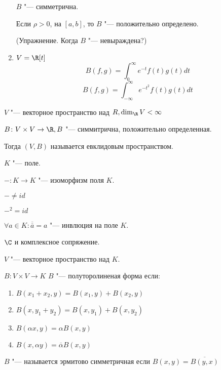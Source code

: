 \begin{exmp}
\begin{enumerate}
$B$ "--- симметрична.

Если $\rho > 0$, на $[a, b]$, то $B$ "--- положительно определено. 

(Упражнение. Когда $B$ "--- невыраждена?)
\item $V = \R[t]$
$$B(f, g) = \int_{0}^{\infty}e^{-t}f(t)g(t)dt$$
$$B(f, g) = \int_{-\infty}^{\infty}e^{-t^2}f(t)g(t)dt$$
\end{enumerate}     
\end{exmp}

\begin{Def}
$V$ "--- векторное пространство над $R, \dim_{\R}V < \infty$

$B \colon V \times V \to \R, B$ "--- симмитрична, положительно определенная.

Тогда $(V, B)$ называется евклидовым пространством. 
\end{Def}

\begin{Def}
$K$ "--- поле.

$-\colon K \to K$ "--- изоморфизм поля $K$.

$- \ne id$

$-^2 = id$

$\forall a \in K\colon \overline{\overline{a}} = a$ "--- инвлюция на поле $K$.
\end{Def}

\begin{exmp}
$\C$ и комплексное сопряжение. 
\end{exmp}

\begin{Def}
$V$ "--- векторное пространство над $K$. 

$B\colon V \times V \to K$  $B$ "--- полуторолиненая форма если:

\begin{enumerate}
\item $B(x_1 + x_2, y) = B(x_1, y) + B(x_2, y)$
\item $B(x, y_1 + y_2) = B(x, y_1) + B(x, y_2)$
\item $B(\alpha x, y) = \alpha B(x, y)$
\item $B(x, \alpha y) = \overline{\alpha}B(x, y)$
\end{enumerate}
\end{Def}

\begin{Def}
$B$ "--- называется эрмитово симметричная если 
$B(x, y) = \overline{B(y, x)}$
\end{Def}

